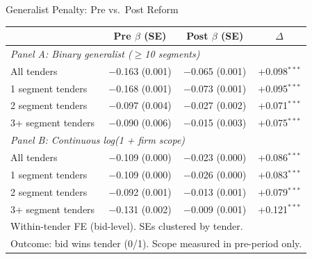 \documentclass[9pt,aspectratio=169]{beamer}
\begin{document}
\begin{frame}{Generalist Penalty: Pre vs.\ Post Reform}
\centering\small
\begin{tabular}{lccc}
\toprule
 & Pre $\beta$ (SE) & Post $\beta$ (SE) & $\Delta$ \\
\midrule
\multicolumn{4}{l}{\textit{Panel A: Binary generalist ($\geq$10 segments)}} \\[3pt]
All tenders & $-$0.163 (0.001) & $-$0.065 (0.001) & +0.098$^{***}$ \\
1 segment tenders & $-$0.168 (0.001) & $-$0.073 (0.001) & +0.095$^{***}$ \\
2 segment tenders & $-$0.097 (0.004) & $-$0.027 (0.002) & +0.071$^{***}$ \\
3+ segment tenders & $-$0.090 (0.006) & $-$0.015 (0.003) & +0.075$^{***}$ \\
\midrule
\multicolumn{4}{l}{\textit{Panel B: Continuous log(1 + firm scope)}} \\[3pt]
All tenders & $-$0.109 (0.000) & $-$0.023 (0.000) & +0.086$^{***}$ \\
1 segment tenders & $-$0.109 (0.000) & $-$0.026 (0.000) & +0.083$^{***}$ \\
2 segment tenders & $-$0.092 (0.001) & $-$0.013 (0.001) & +0.079$^{***}$ \\
3+ segment tenders & $-$0.131 (0.002) & $-$0.009 (0.001) & +0.121$^{***}$ \\
\bottomrule
\multicolumn{4}{l}{\footnotesize Within-tender FE (bid-level). SEs clustered by tender.} \\
\multicolumn{4}{l}{\footnotesize Outcome: bid wins tender (0/1). Scope measured in pre-period only.} \\
\end{tabular}
\end{frame}
\end{document}
